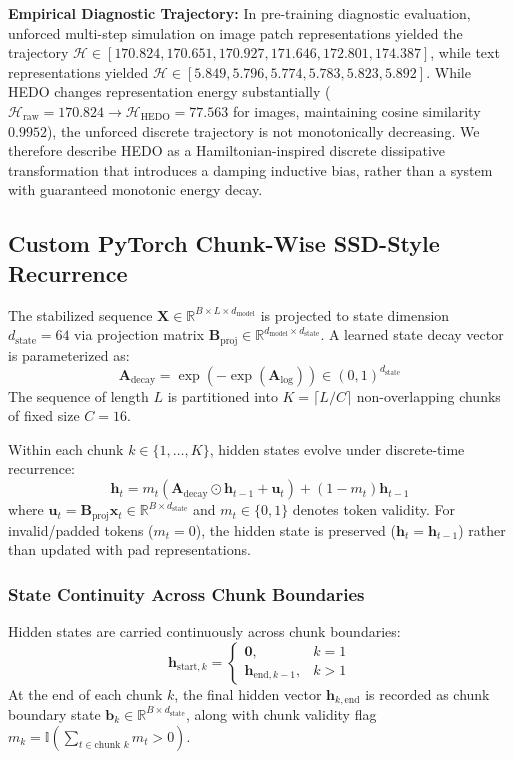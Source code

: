 \documentclass[journal]{IEEEtran}
\begin{document}
\textbf{Empirical Diagnostic Trajectory:} In pre-training diagnostic evaluation, unforced multi-step simulation on image patch representations yielded the trajectory $\mathcal{H} \in [170.824, 170.651, 170.927, 171.646, 172.801, 174.387]$, while text representations yielded $\mathcal{H} \in [5.849, 5.796, 5.774, 5.783, 5.823, 5.892]$. While HEDO changes representation energy substantially ($\mathcal{H}_{\text{raw}} = 170.824 \to \mathcal{H}_{\text{HEDO}} = 77.563$ for images, maintaining cosine similarity $0.9952$), the unforced discrete trajectory is not monotonically decreasing. We therefore describe HEDO as a Hamiltonian-inspired discrete dissipative transformation that introduces a damping inductive bias, rather than a system with guaranteed monotonic energy decay.

\subsection{Custom PyTorch Chunk-Wise SSD-Style Recurrence}
The stabilized sequence $\mathbf{X} \in \mathbb{R}^{B \times L \times d_{\text{model}}}$ is projected to state dimension $d_{\text{state}} = 64$ via projection matrix $\mathbf{B}_{\text{proj}} \in \mathbb{R}^{d_{\text{model}} \times d_{\text{state}}}$. A learned state decay vector is parameterized as:
\begin{equation}
\mathbf{A}_{\text{decay}} = \exp(-\exp(\mathbf{A}_{\text{log}})) \in (0, 1)^{d_{\text{state}}}
\end{equation}
The sequence of length $L$ is partitioned into $K = \lceil L / C \rceil$ non-overlapping chunks of fixed size $C = 16$.

Within each chunk $k \in \{1, \dots, K\}$, hidden states evolve under discrete-time recurrence:
\begin{equation}
\mathbf{h}_{t} = m_t \left( \mathbf{A}_{\text{decay}} \odot \mathbf{h}_{t-1} + \mathbf{u}_t \right) + (1 - m_t) \mathbf{h}_{t-1}
\end{equation}
where $\mathbf{u}_t = \mathbf{B}_{\text{proj}} \mathbf{x}_t \in \mathbb{R}^{B \times d_{\text{state}}}$ and $m_t \in \{0, 1\}$ denotes token validity. For invalid/padded tokens ($m_t = 0$), the hidden state is preserved ($\mathbf{h}_t = \mathbf{h}_{t-1}$) rather than updated with pad representations.

\subsubsection{State Continuity Across Chunk Boundaries}
Hidden states are carried continuously across chunk boundaries:
\begin{equation}
\mathbf{h}_{\text{start}, k} = \begin{cases} \mathbf{0}, & k = 1 \\ \mathbf{h}_{\text{end}, k-1}, & k > 1 \end{cases}
\end{equation}
At the end of each chunk $k$, the final hidden vector $\mathbf{h}_{k, \text{end}}$ is recorded as chunk boundary state $\mathbf{b}_k \in \mathbb{R}^{B \times d_{\text{state}}}$, along with chunk validity flag $m_k = \mathbb{I}(\sum_{t \in \text{chunk } k} m_t > 0)$.
\end{document}
